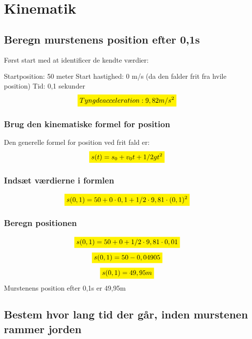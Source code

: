 \section{Kinematik}
\subsection{Beregn murstenens position efter 0,1s}
Først start med at identificer de kendte værdier:

Startposition: 50 meter 
\newline
Start hastighed: 0 m/s (da den falder frit fra hvile position)
\newline
Tid: 0,1 sekunder
\begin{equation*}
    \mathcolorbox{yellow}{Tyngdeacceleration: 9,82m/s^{2}}
\end{equation*}


\subsubsection{Brug den kinematiske formel for position}
Den generelle formel for position ved frit fald er:
\begin{equation*}
    \mathcolorbox{yellow}{s(t)=s_0+v_0t+1/2gt^{2}}
\end{equation*}

\subsubsection{Indsæt værdierne i formlen}
\begin{equation*}
    \mathcolorbox{yellow}{s(0,1)=50+0\cdot0,1+1/2\cdot9,81\cdot(0,1)^{2}}
\end{equation*}

\subsubsection{Beregn positionen}
\begin{equation*}
    \mathcolorbox{yellow}{s(0,1)=50+0+1/2\cdot9,81\cdot0,01}
\end{equation*}
\begin{equation*}
    \mathcolorbox{yellow}{s(0,1)=50-0,04905}
\end{equation*}
\begin{equation*}
    \mathcolorbox{yellow}{s(0,1)=49,95m}
\end{equation*}
Murstenens position efter 0,1s er 49,95m

\subsection{Bestem hvor lang tid der går, inden murstenen rammer jorden}

